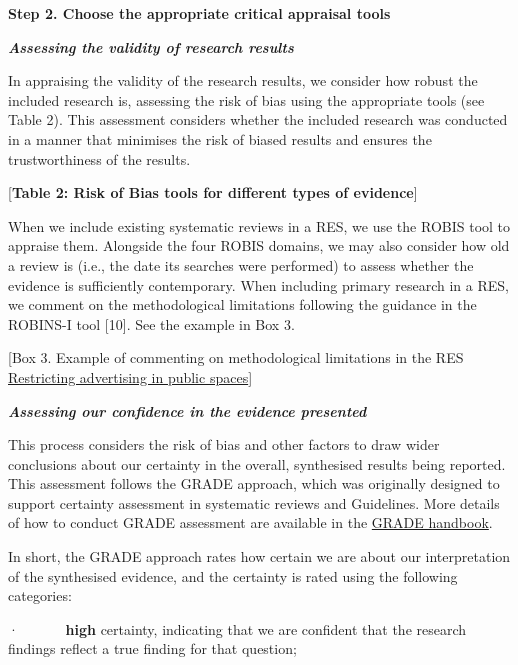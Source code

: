 \documentclass[
  letterpaper,
  DIV=11,
  numbers=noendperiod]{scrreprt}
\begin{document}
\textbf{Step 2. Choose the appropriate critical appraisal tools}

\textbf{\emph{Assessing the validity of research results}}

In appraising the validity of the research results, we consider how
robust the included research is, assessing the risk of bias using the
appropriate tools (see Table 2). This assessment considers whether the
included research was conducted in a manner that minimises the risk of
biased results and ensures the trustworthiness of the results.

{[}\textbf{Table 2: Risk of Bias tools for different types of
evidence}{]}

When we include existing systematic reviews in a RES, we use the ROBIS
tool to appraise them. Alongside the four ROBIS domains, we may also
consider how old a review is (i.e., the date its searches were
performed) to assess whether the evidence is sufficiently contemporary.
When including primary research in a RES, we comment on the
methodological limitations following the guidance in the ROBINS-I tool
{[}10{]}. See the example in Box 3.

{[}Box 3. Example of commenting on methodological limitations in the RES
\href{https://arc-gm.nihr.ac.uk/media/Resources/ARC/Evaluation/RES/Implementing\%20policies\%20that\%20restrict\%20the\%20use\%20of\%20outdoor\%20spaces\%20for\%20advertising\%20harmful\%20commodities/ARC-GM\%20RES\%20outdoor\%20advertising\%20harmful\%20commodities\%20revised.pdf}{Restricting
advertising in public spaces}{]}

\textbf{\emph{Assessing our confidence in the evidence presented}}

This process considers the risk of bias and other factors to draw wider
conclusions about our certainty in the overall, synthesised results
being reported. This assessment follows the GRADE approach, which was
originally designed to support certainty assessment in systematic
reviews and Guidelines. More details of how to conduct GRADE assessment
are available in the
\href{https://gdt.gradepro.org/app/handbook/handbook.html}{GRADE
handbook}.

In short, the GRADE approach rates how certain we are about our
interpretation of the synthesised evidence, and the certainty is rated
using the following categories:

·~~~~~~ \textbf{high} certainty, indicating that we are confident that
the research findings reflect a true finding for that question;
\end{document}
